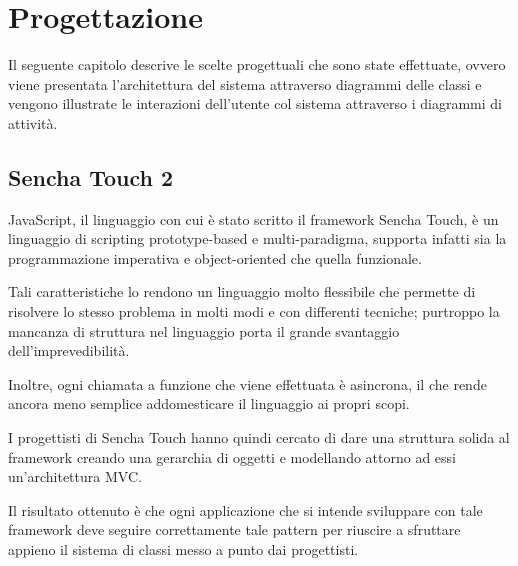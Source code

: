 \chapter{Progettazione}\label{ch:progettazione}
Il seguente capitolo descrive le scelte progettuali che sono state effettuate, ovvero viene presentata l'architettura del sistema attraverso diagrammi delle classi e vengono illustrate le interazioni dell'utente col sistema attraverso i diagrammi di attività.

\section{Sencha Touch 2}
JavaScript, il linguaggio con cui è stato scritto il framework Sencha Touch, è un linguaggio di scripting prototype-based e multi-paradigma, supporta infatti sia la programmazione imperativa e object-oriented che quella funzionale.

Tali caratteristiche lo rendono un linguaggio molto flessibile che permette di risolvere lo stesso problema in molti modi e con differenti tecniche; purtroppo la mancanza di struttura nel linguaggio porta il grande svantaggio dell'imprevedibilità.

Inoltre, ogni chiamata a funzione che viene effettuata è asincrona, il che rende ancora meno semplice addomesticare il linguaggio ai propri scopi.

I progettisti di Sencha Touch hanno quindi cercato di dare una struttura solida al framework creando una gerarchia di oggetti e modellando attorno ad essi un'architettura \ac{MVC}.

Il risultato ottenuto è che ogni applicazione che si intende sviluppare con tale framework deve seguire correttamente tale pattern per riuscire a sfruttare appieno il sistema di classi messo a punto dai progettisti.


